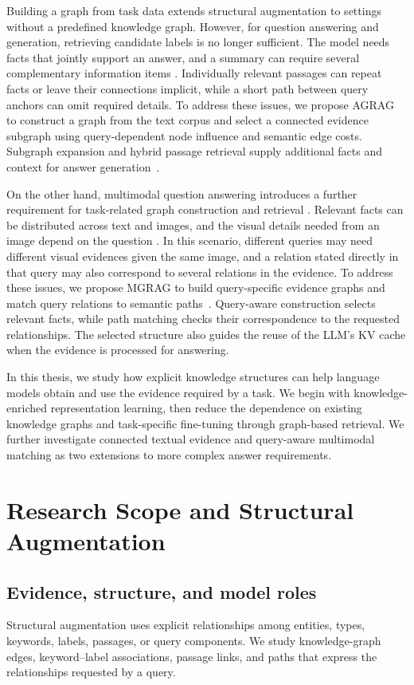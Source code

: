 Building a graph from task data extends structural augmentation to settings without a predefined knowledge graph. However, for question answering and generation, retrieving candidate labels is no longer sufficient. The model needs facts that jointly support an answer, and a summary can require several complementary information items \cite{}. Individually relevant passages can repeat facts or leave their connections implicit, while a short path between query anchors can omit required details. To address these issues, we propose AGRAG to construct a graph from the text corpus and select a connected evidence subgraph using query-dependent node influence and semantic edge costs. Subgraph expansion and hybrid passage retrieval supply additional facts and context for answer generation~\cite{agrag-paper}.

On the other hand, multimodal question answering introduces a further requirement for task-related graph construction and retrieval \cite{}. Relevant facts can be distributed across text and images, and the visual details needed from an image depend on the question \cite{}. 
In this scenario, different queries may need different visual evidences given the same image, and a relation stated directly in that query may also correspond to several relations in the evidence. 
To address these issues, we propose MGRAG to build query-specific evidence graphs and match query relations to semantic paths~\cite{mgrag-paper}. Query-aware construction selects relevant facts, while path matching checks their correspondence to the requested relationships. The selected structure also guides the reuse of the LLM's KV cache when the evidence is processed for answering.

In this thesis, we study how explicit knowledge structures can help language models obtain and use the evidence required by a task. We begin with knowledge-enriched representation learning, then reduce the dependence on existing knowledge graphs and task-specific fine-tuning through graph-based retrieval. We further investigate connected textual evidence and query-aware multimodal matching as two extensions to more complex answer requirements.

\section{Research Scope and Structural Augmentation}
\label{sec:introduction:scope}
\subsection{Evidence, structure, and model roles}
Structural augmentation uses explicit relationships among entities, types, keywords, labels, passages, or query components. We study knowledge-graph edges, keyword--label associations, passage links, and paths that express the relationships requested by a query.

